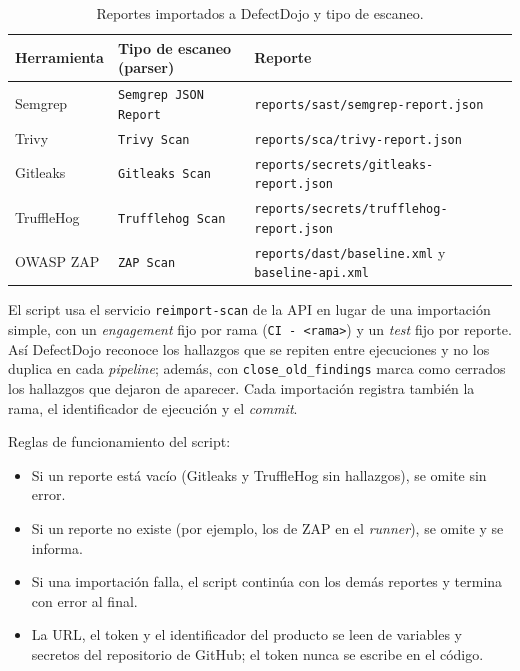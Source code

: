 \begin{table}[H]
\centering
\caption{Reportes importados a DefectDojo y tipo de escaneo.}
\label{tab:dojo-reportes}

\begin{tabularx}{\textwidth}{l l X}
\toprule
\textbf{Herramienta} &
\textbf{Tipo de escaneo (parser)} &
\textbf{Reporte} \\
\midrule
Semgrep & \texttt{Semgrep JSON Report} &
\texttt{reports/sast/semgrep-report.json} \\
Trivy & \texttt{Trivy Scan} &
\texttt{reports/sca/trivy-report.json} \\
Gitleaks & \texttt{Gitleaks Scan} &
\texttt{reports/secrets/gitleaks-report.json} \\
TruffleHog & \texttt{Trufflehog Scan} &
\texttt{reports/secrets/trufflehog-report.json} \\
OWASP ZAP & \texttt{ZAP Scan} &
\texttt{reports/dast/baseline.xml} y \texttt{baseline-api.xml} \\
\bottomrule
\end{tabularx}
\end{table}

El script usa el servicio \texttt{reimport-scan} de la API en lugar de una
importación simple, con un \textit{engagement} fijo por rama
(\texttt{CI - <rama>}) y un \textit{test} fijo por reporte. Así DefectDojo
reconoce los hallazgos que se repiten entre ejecuciones y no los duplica en
cada \textit{pipeline}; además, con \texttt{close\_old\_findings} marca como
cerrados los hallazgos que dejaron de aparecer. Cada importación registra
también la rama, el identificador de ejecución y el \textit{commit}.

Reglas de funcionamiento del script:

\begin{itemize}
    \item Si un reporte está vacío (Gitleaks y TruffleHog sin hallazgos), se
    omite sin error.
    \item Si un reporte no existe (por ejemplo, los de ZAP en el
    \textit{runner}), se omite y se informa.
    \item Si una importación falla, el script continúa con los demás reportes
    y termina con error al final.
    \item La URL, el token y el identificador del producto se leen de
    variables y secretos del repositorio de GitHub; el token nunca se escribe
    en el código.
\end{itemize}


